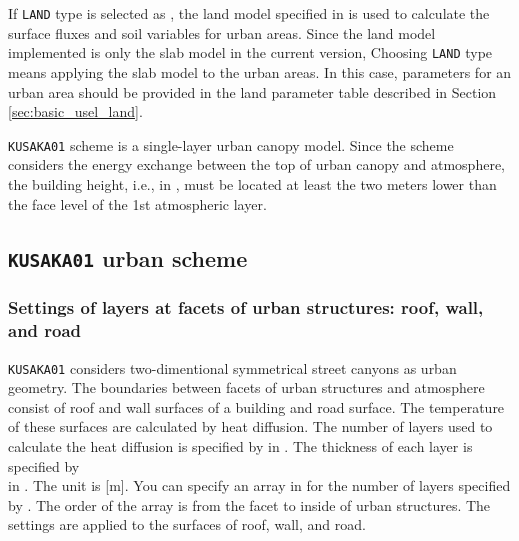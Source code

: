 If \verb|LAND| type is selected as ,
the land model specified in  is used to calculate the surface fluxes and soil variables for urban areas.
Since the land model implemented is only the slab model in the current version,
Choosing \verb|LAND| type means applying the slab model to the urban areas.
In this case, parameters for an urban area should be provided in the land parameter table described in Section \ref{sec:basic_usel_land}.


\verb|KUSAKA01| scheme is a single-layer urban canopy model.
Since the scheme considers the energy exchange between the top of urban canopy and atmosphere,
the building height, i.e.,  in , must be located at least the two meters lower than the face level of the 1st atmospheric layer.


\subsection{\texttt{KUSAKA01} urban scheme}
\subsubsection{Settings of layers at facets of urban structures: roof, wall, and road}

\verb|KUSAKA01| considers two-dimentional symmetrical street canyons as urban geometry.
The boundaries between facets of urban structures and atmosphere
consist of roof and wall surfaces of a building and road surface.
The temperature of these surfaces are calculated by heat diffusion.
The number of layers used to calculate the heat diffusion is specified by  in .
The thickness of each layer is specified by \\ in . The unit is [m].
You can specify an array in  for the number of layers specified by .
The order of the array is from the facet to inside of urban structures.
The settings are applied to the surfaces of roof, wall, and road.


